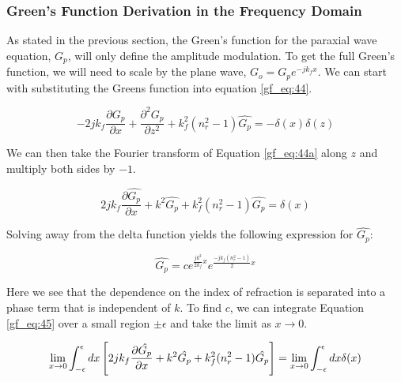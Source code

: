 \subsubsection {Green's Function Derivation in the Frequency Domain} \label{gf_sec:paraxial_gf_derivation}
As stated in the previous section, the Green's function for the paraxial wave equation, $G_p$, will only define the amplitude modulation. To get the full Green's function, we will need to scale by the plane wave, $G_o= G_p e^{-jk_fx}$. We can start with substituting the Greens function into equation \ref{gf_eq:44}.

\begin{equation}
-2jk_f\frac{\partial G_p}{\partial x} + \frac{\partial^2 G_p}{\partial z^2} +k_f^2(n_r^2-1)\hat{G_p}= -\delta(x)\delta(z)
\label{gf_eq:44a}
\end{equation}
 \renewcommand{\baselinestretch}{2} \small\normalsize
 
We can then take the Fourier transform of Equation \ref{gf_eq:44a} along $z$ and multiply both sides by $-1$.

\begin{equation}
2jk_f\frac{\partial \hat{G_p}}{\partial x} +k^2\hat{G_p} +k_f^2(n_r^2-1)\hat{G_p}= \delta(x)
\label{gf_eq:45}
\end{equation}
 \renewcommand{\baselinestretch}{2} \small\normalsize
 
Solving away from the delta function yields the following expression for $\hat{G_p}$:

\begin{equation}
\hat{G_p}= ce^{\frac{jk^2}{2k_f}x}e^{\frac{-jk_f(n_r^2-1)}{2}x}
\label{gf_eq:46}
\end{equation}
 \renewcommand{\baselinestretch}{2} \small\normalsize
 
Here we see that the dependence on the index of refraction is separated into a phase term that is independent of $k$. To find $c$, we can integrate Equation \ref{gf_eq:45} over a small region $\pm\epsilon$ and take the limit as $x\rightarrow 0$.

\begin{equation}
\lim_{x\rightarrow 0}\int_{-\epsilon}^{\epsilon}dx\left[2jk_f\frac{\partial\hat{G_p}}{\partial x}+ k^2\hat{G_p} +k_f^2(n_r^2-1)\hat{G_p} \right] = \lim_{x\rightarrow 0}\int_{-\epsilon}^{\epsilon}dx\delta(x)\\
\label{gf_eq:47}
\end{equation}
 \renewcommand{\baselinestretch}{2} \small\normalsize
 
